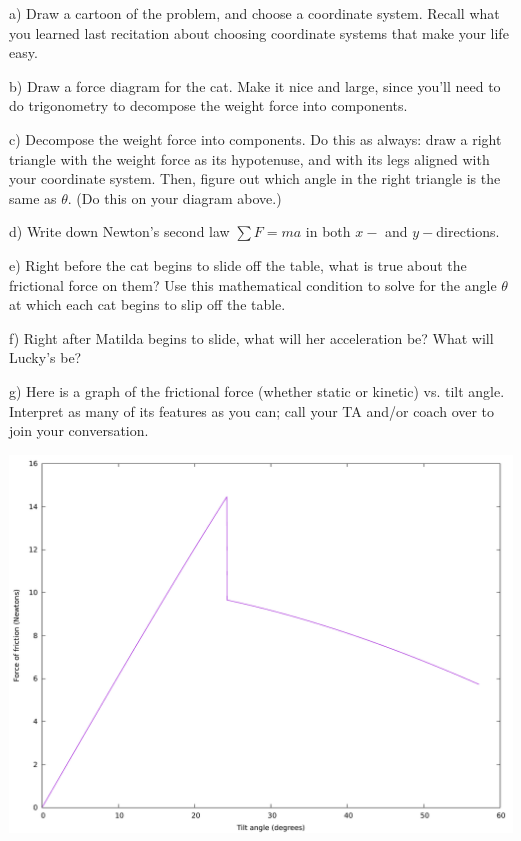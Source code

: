 \documentclass[12pt]{article}
\begin{document}
a) Draw a cartoon of the problem, and choose a coordinate system. Recall what you learned last recitation about choosing
coordinate systems that make your life easy.

\vspace{2in}
\newpage

b) Draw a force diagram for the cat. Make it nice and large, since you'll need to do trigonometry to decompose the 
weight force into components.

\vspace{3in}


c) Decompose the weight force into components. Do this as always: draw a right triangle with the weight force as its 
hypotenuse, and with its legs aligned with your coordinate system. Then, figure out which angle in the right triangle
is the same as $\theta$. (Do this on your diagram above.)

d) Write down Newton's second law $\sum F = ma$ in both $x-$ and $y-$directions. 

\vspace{2in}

e) Right before the cat begins to slide off the table, what is true about the frictional force on them? Use this 
mathematical condition to solve for the angle $\theta$ at which each cat begins to slip off the table.

\vspace{2in}
\newpage
f) Right after Matilda begins to slide, what will her acceleration be? What will Lucky's be?

\vspace{3in}

g) Here is a graph of the frictional force (whether static or kinetic) vs. tilt angle. Interpret as many of its features as you
can; call your TA and/or coach over to join your conversation.

\begin{center}
\includegraphics[width=.9\textwidth]{tilt.pdf}
\end{center}
\end{document}
